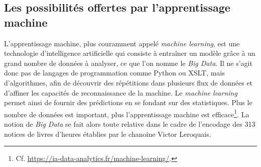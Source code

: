 \documentclass[a4paper,12pt,twoside]{book}
\begin{document}
	\subsection{Les possibilités offertes par l’apprentissage machine}
	
	L'apprentissage machine, plus couramment appelé \og \textit{machine learning}\fg{}, est une technologie d'intelligence artificielle qui consiste à entraîner un modèle grâce à un grand nombre de données à analyser, ce que l'on nomme le \textit{Big Data}. Il ne s'agit donc pas de langages de programmation comme Python ou XSLT, mais d'algorithmes, afin de découvrir des répétitions dans plusieurs flux de données et d'affiner les capacités de reconnaissance de la machine. Le \textit{machine learning} permet ainsi de fournir des prédictions en se fondant sur des statistiques. Plus le nombre de données est important, plus l'apprentissage machine est efficace\footnote{Cf. \url{https://ia-data-analytics.fr/machine-learning/}.}. La notion de \textit{Big Data} se fait alors toute relative dans le cadre de l'encodage des 313 notices de livres d'heures établies par le chanoine Victor Leroquais. \\
	
\end{document}

